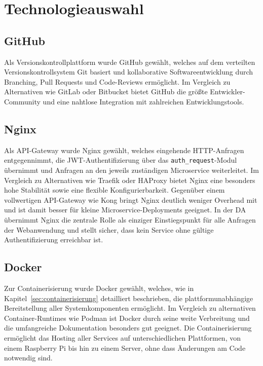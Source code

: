 
\section{Technologieauswahl}

\subsection{GitHub}

Als Versionskontrollplattform wurde GitHub gewählt, welches auf dem 
verteilten Versionskontrollsystem Git basiert und kollaborative 
Softwareentwicklung durch Branching, Pull Requests und Code-Reviews 
ermöglicht.\cite{github}
Im Vergleich zu Alternativen wie GitLab oder Bitbucket bietet GitHub 
die größte Entwickler-Community und eine nahtlose Integration mit zahlreichen 
Entwicklungstools. 

\subsection{Nginx}

Als \gls{API}-Gateway wurde Nginx gewählt, welches eingehende 
HTTP-Anfragen entgegennimmt, die \gls{JWT}-Authentifizierung über das 
\texttt{auth\_request}-Modul übernimmt und Anfragen an den jeweils 
zuständigen Microservice weiterleitet.\cite{nginx}
Im Vergleich zu Alternativen wie Traefik oder HAProxy bietet Nginx eine 
besonders hohe Stabilität sowie eine flexible Konfigurierbarkeit. Gegenüber einem vollwertigen \gls{API}-Gateway wie Kong 
bringt Nginx deutlich weniger Overhead mit und ist damit besser für 
kleine Microservice-Deployments geeignet.
In der \gls{DA} übernimmt Nginx die zentrale Rolle als einziger 
Einstiegspunkt für alle Anfragen der Webanwendung und stellt sicher, 
dass kein Service ohne gültige Authentifizierung erreichbar ist.

\subsection{Docker}

Zur Containerisierung wurde Docker gewählt, welches, wie in 
Kapitel~\ref{sec:containerisierung} detailliert beschrieben, die 
plattformunabhängige Bereitstellung aller Systemkomponenten ermöglicht. 
\cite{docker_overview}
Im Vergleich zu alternativen Container-Runtimes wie Podman ist Docker 
durch seine weite Verbreitung und die umfangreiche Dokumentation besonders gut geeignet.
Die Containerisierung ermöglicht das Hosting aller Services auf unterschiedlichen Plattformen,
von einem Raspberry Pi bis hin zu einem Server, ohne dass Änderungen am Code notwendig sind.

